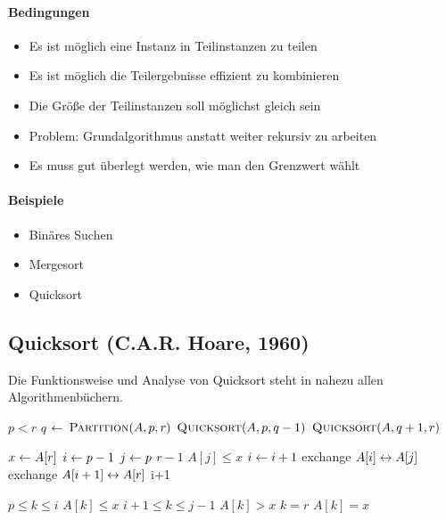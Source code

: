 \documentclass[a4paper]{scrartcl}
\begin{document}
\paragraph{Bedingungen}
\begin{itemize}
	\item Es ist möglich eine Instanz in Teilinstanzen zu teilen
	\item Es ist möglich die Teilergebnisse effizient zu kombinieren
	\item Die Größe der Teilinstanzen soll möglichst gleich sein
	\item Problem: Grundalgorithmus anstatt weiter rekursiv zu arbeiten
	\item Es muss gut überlegt werden, wie man den Grenzwert wählt
\end{itemize}

\paragraph{Beispiele}
\begin{itemize}
	\item Binäres Suchen
	\item Mergesort
	\item Quicksort
\end{itemize}

\subsection{Quicksort (C.A.R. Hoare, 1960)}
Die Funktionsweise und Analyse von Quicksort steht in nahezu allen Algorithmenbüchern.

\begin{codebox}
\li	\If $p<r$
\li		\Then 
				$q$ $\leftarrow$ $\textnormal{\scshape Partition} (A,p,r)$
\li			$\textnormal{\scshape Quicksort}(A,p,q-1)$
\li			$\textnormal{\scshape Quicksort}(A,q+1,r)$
		\End
\end{codebox}

\begin{codebox}
\li $x \leftarrow A[r]$
\li $i \leftarrow p-1$
\li \For $j \leftarrow p$ \To $r-1$
\li		\Do
				\If $A[j] \leq x$
\li				\Then 
						$i \leftarrow i+1$
\li					exchange $A[i] \leftrightarrow A[j]$
				\End
		\End
\li	exchange $A[i+1] \leftrightarrow A[r]$
\li	\Return i+1
\end{codebox}

\begin{codebox}
\li \If $p \leq k \leq i$
\li		\Then $A[k] \leq x$
		\End
\li \If $i+1 \leq k \leq j-1$
\li		\Then $A[k] > x$
		\End
\li \If $k=r$
\li		\Then $A[k]=x$
		\End
\end{codebox}
\end{document}
